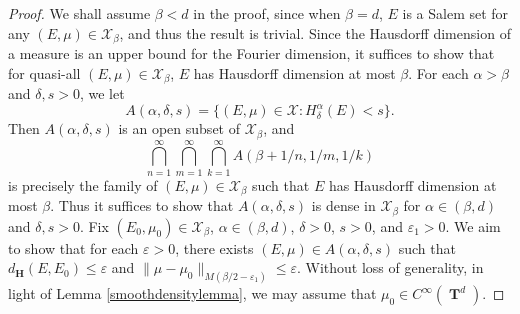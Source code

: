 \documentclass[dvipsnames,letterpaper,12pt]{article}
\numberwithin{equation}{section}
\DeclareMathOperator{\hausdim}{\dim_{\mathbf{H}}}
\DeclareMathOperator{\fordim}{\dim_{\mathbf{F}}}
\DeclareMathOperator{\TT}{\mathbf{T}}
\numberwithin{theorem}{section}
\begin{document}
\begin{proof}
    We shall assume $\beta < d$ in the proof, since when $\beta = d$, $E$ is a Salem set for any $(E,\mu) \in \mathcal{X}_\beta$, and thus the result is trivial. Since the Hausdorff dimension of a measure is an upper bound for the Fourier dimension, it suffices to show that for quasi-all $(E,\mu) \in \mathcal{X}_\beta$, $E$ has Hausdorff dimension at most $\beta$. For each $\alpha > \beta$ and $\delta, s > 0$, we let
    \[ A(\alpha,\delta,s) = \{ (E,\mu) \in \mathcal{X}: H^\alpha_\delta(E) < s \}. \]
    Then $A(\alpha,\delta,s)$ is an open subset of $\mathcal{X}_\beta$, and
    \begin{equation}
        \bigcap_{n = 1}^\infty \bigcap_{m = 1}^\infty \bigcap_{k = 1}^\infty A(\beta + 1/n, 1/m, 1/k)
    \end{equation}
    is precisely the family of $(E,\mu) \in \mathcal{X}_\beta$ such that $E$ has Hausdorff dimension at most $\beta$.
%
    Thus it suffices to show that $A(\alpha,\delta,s)$ is dense in $\mathcal{X}_\beta$ for $\alpha \in (\beta,d)$ and $\delta, s > 0$. Fix $(E_0,\mu_0) \in \mathcal{X}_\beta$, $\alpha \in (\beta,d)$, $\delta > 0$, $s > 0$, and $\varepsilon_1 > 0$. We aim to show that for each $\varepsilon > 0$, there exists $(E,\mu) \in A(\alpha,\delta,s)$ such that $d_\mathbf{H}(E,E_0) \leq \varepsilon$ and $\| \mu - \mu_0 \|_{M(\beta/2 - \varepsilon_1)} \leq \varepsilon$. Without loss of generality, in light of Lemma \ref{smoothdensitylemma}, we may assume that $\mu_0 \in C^\infty(\TT^d)$.


\end{proof}
\end{document}
